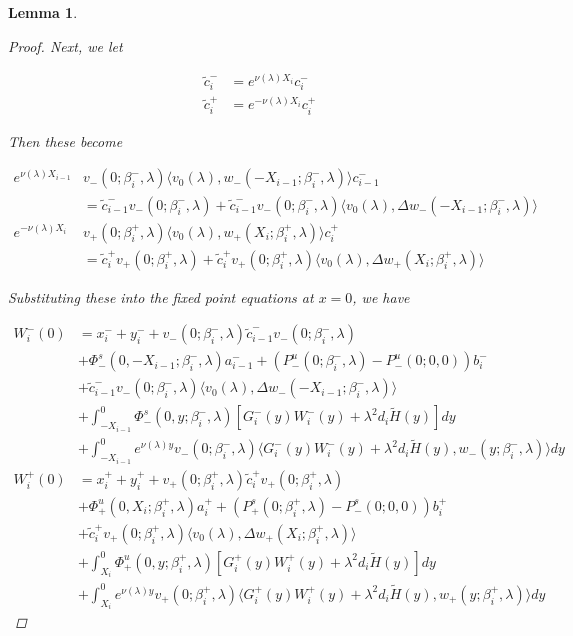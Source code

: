 \documentclass[12pt]{article}
\newtheorem{lemma}{Lemma}
\begin{document}
\begin{lemma}
\begin{proof}
Next, we let

\begin{align*}
\tilde{c}_i^- &= e^{\nu(\lambda)X_i} c_i^- \\
\tilde{c}_i^+ &= e^{-\nu(\lambda)X_i} c_i^+
\end{align*}

Then these become

\begin{align*}
e^{\nu(\lambda)X_{i-1}} &v_-(0; \beta_i^-, \lambda) \langle v_0(\lambda), w_-(-X_{i-1}; \beta_i^-, \lambda) \rangle c_{i-1}^- \\
&= \tilde{c}_{i-1}^- v_-(0; \beta_i^-, \lambda) + \tilde{c}_{i-1}^- v_-(0; \beta_i^-, \lambda) \langle v_0(\lambda), \Delta w_-(-X_{i-1}; \beta_i^-, \lambda) \rangle \\
e^{-\nu(\lambda)X_i} &v_+(0; \beta_i^+, \lambda) \langle v_0(\lambda), w_+(X_i; \beta_i^+, \lambda) \rangle c_i^+ \\
&= \tilde{c}_i^+ v_+(0; \beta_i^+, \lambda) + \tilde{c}_i^+ v_+(0; \beta_i^+, \lambda) \langle v_0(\lambda), \Delta w_+(X_i; \beta_i^+, \lambda) \rangle 
\end{align*}

Substituting these into the fixed point equations at $x = 0$, we have

\begin{align*}
W_i^-(0) &= x_i^- + y_i^- + v_-(0; \beta_i^-, \lambda) \tilde{c}_{i-1}^- v_-(0; \beta_i^-, \lambda) \\
&+\Phi^s_-(0, -X_{i-1}; \beta_i^-, \lambda)a_{i-1}^- + (P^u_-(0; \beta_i^-, \lambda) - P^u_-(0; 0, 0))b_i^- \\
&+ \tilde{c}_{i-1}^- v_-(0; \beta_i^-, \lambda) \langle v_0(\lambda), \Delta w_-(-X_{i-1}; \beta_i^-, \lambda) \rangle \\
&+ \int_{-X_{i-1}}^0 \Phi^s_-(0, y; \beta_i^-, \lambda) [ G_i^-(y)W_i^-(y) + \lambda^2 d_i \tilde{H}(y) ] dy \\
&+ \int_{-X_{i-1}}^0
e^{\nu(\lambda)y} v_-(0; \beta_i^-, \lambda) \langle G_i^-(y)W_i^-(y) + \lambda^2 d_i \tilde{H}(y), w_-(y; \beta_i^-, \lambda) \rangle dy \\
W_i^+(0) &= x_i^+ + y_i^+ + v_+(0; \beta_i^+, \lambda) \tilde{c}_i^+ v_+(0; \beta_i^+, \lambda) \\
&+\Phi^u_+(0, X_i; \beta_i^+, \lambda)a_i^+ + (P^s_+(0; \beta_i^+, \lambda) - P^s_-(0; 0, 0))b_i^+ \\
&+ \tilde{c}_i^+ v_+(0; \beta_i^+, \lambda) \langle v_0(\lambda), \Delta w_+(X_i; \beta_i^+, \lambda) \rangle \\  
&+ \int_{X_i}^0 \Phi^u_+(0, y; \beta_i^+, \lambda) [ G_i^+(y)W_i^+(y) + \lambda^2 d_i \tilde{H}(y) ] dy \\
&+ \int_{X_i}^0 e^{\nu(\lambda)y} v_+(0; \beta_i^+, \lambda) \langle G_i^+(y)W_i^+(y) + \lambda^2 d_i \tilde{H}(y), w_+(y; \beta_i^+, \lambda) \rangle dy
\end{align*}


\end{proof}
\end{lemma}
\end{document}

